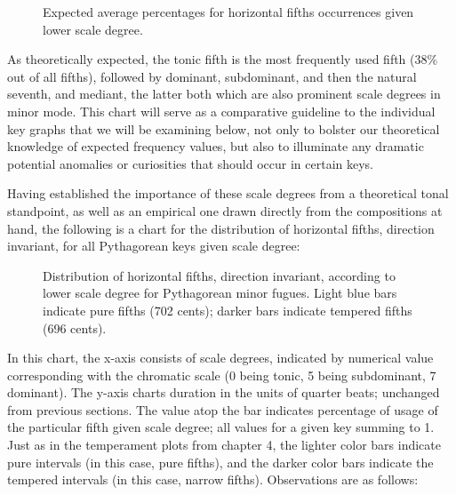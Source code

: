 \begin{figure}[H]
\vspace{1.5em}
    \centering
    \caption{Expected average percentages for horizontal fifths occurrences given lower scale degree. }
\end{figure}    As theoretically expected, the tonic fifth is the most frequently used
fifth (38\% out of all fifths), followed by dominant, subdominant, and
then the natural seventh, and mediant, the latter both which are also
prominent scale degrees in minor mode. This chart will serve as a
comparative guideline to the individual key graphs that we will be
examining below, not only to bolster our theoretical knowledge of
expected frequency values, but also to illuminate any dramatic potential
anomalies or curiosities that should occur in certain keys.

Having established the importance of these scale degrees from a
theoretical tonal standpoint, as well as an empirical one drawn directly
from the compositions at hand, the following is a chart for the
distribution of horizontal fifths, direction invariant, for all
Pythagorean keys given scale degree:



\begin{figure}[H]
\vspace{1.5em}
    \centering
    \caption[ Distribution of horizontal fifths, direction invariant, according to lower scale degree for Pythagorean minor fugues. ]{Distribution of horizontal fifths, direction invariant, according to lower scale degree for Pythagorean minor fugues. Light blue bars indicate pure fifths (702 cents); darker bars indicate tempered fifths (696 cents).}
\end{figure}    In this chart, the x-axis consists of scale degrees, indicated by
numerical value corresponding with the chromatic scale (0 being tonic, 5
being subdominant, 7 dominant). The y-axis charts duration in the units
of quarter beats; unchanged from previous sections. The value atop the
bar indicates percentage of usage of the particular fifth given scale
degree; all values for a given key summing to 1. Just as in the
temperament plots from chapter 4, the lighter color bars indicate pure
intervals (in this case, pure fifths), and the darker color bars
indicate the tempered intervals (in this case, narrow fifths).
Observations are as follows:

